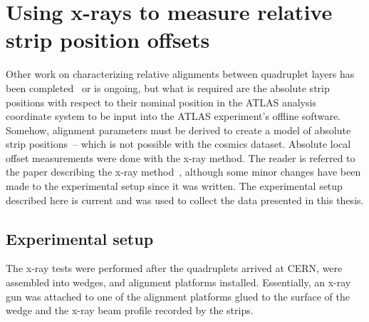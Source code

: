
\chapter{Using x-rays to measure relative strip position offsets}
\label{chap:xray}

Other work on characterizing relative alignments between quadruplet layers has been completed~\cite{zhao_cosmic_2019} or is ongoing, but what is required are the absolute strip positions with respect to their nominal position in the ATLAS analysis coordinate system to be input into the ATLAS experiment's offline software. Somehow, alignment parameters must be derived to create a model of absolute strip positions~-- which is not possible with the cosmics dataset. Absolute local offset measurements were done with the x-ray method. The reader is referred to the paper describing the x-ray method~\cite{lefebvre_precision_2020}, although some minor changes have been made to the experimental setup since it was written. The experimental setup described here is current and was used to collect the data presented in this thesis.

\section{Experimental setup}

The x-ray tests were performed after the quadruplets arrived at CERN, were assembled into wedges, and alignment platforms installed. Essentially, an x-ray gun was attached to one of the alignment platforms glued to the surface of the wedge and the x-ray beam profile recorded by the strips.

